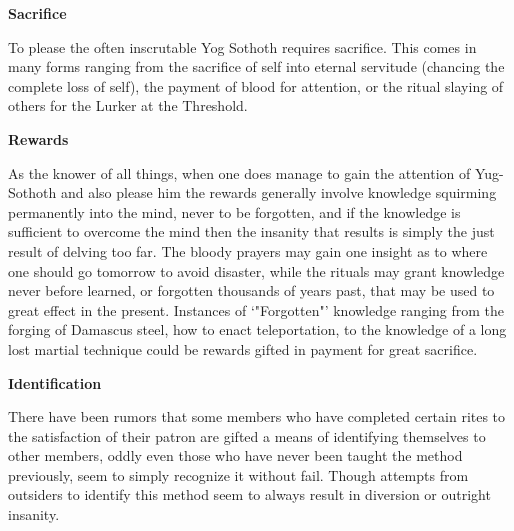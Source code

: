 \documentclass[blue]{guildcamp4}
\begin{document}
\begin{center}{\bf Sacrifice}\end{center}

To please the often inscrutable Yog Sothoth requires sacrifice. This comes in many forms ranging from the sacrifice of self into eternal servitude (chancing the complete loss of self), the payment of blood for attention, or the ritual slaying of others for the Lurker at the Threshold. 

\begin{center}{\bf Rewards}\end{center}

As the knower of all things, when one does manage to gain the attention of Yug-Sothoth and also please him the rewards generally involve knowledge squirming permanently into the mind, never to be forgotten, and if the knowledge is sufficient to overcome the mind then the insanity that results is simply the just result of delving too far.  The bloody prayers may gain one insight as to where one should go tomorrow to avoid disaster, while the rituals may grant knowledge never before learned, or forgotten thousands of years past, that may be used to great effect in the present.  Instances of ‘"Forgotten"’ knowledge ranging from the forging of Damascus steel, how to enact teleportation, to the knowledge of a long lost martial technique could be rewards gifted in payment for great sacrifice.

\begin{center}{\bf Identification}\end{center}

There have been rumors that some members who have completed certain rites to the satisfaction of their patron are gifted a means of identifying themselves to other members, oddly even those who have never been taught the method previously, seem to simply recognize it without fail. Though attempts from outsiders to identify this method seem to always result in diversion or outright insanity.  










%
\end{document}
